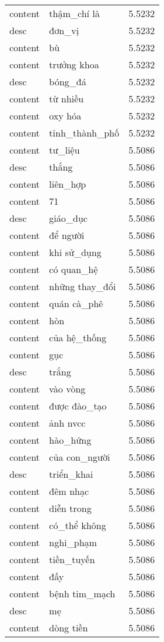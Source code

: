 \documentclass{article}
\begin{document}
\begin{tabular}{lll}
content & thậm\_chí là & 5.5232\\
desc & đơn\_vị & 5.5232\\
content & bù & 5.5232\\
content & trưởng khoa & 5.5232\\
desc & bóng\_đá & 5.5232\\
content & từ nhiều & 5.5232\\
content & oxy hóa & 5.5232\\
content & tỉnh\_thành\_phố & 5.5232\\
content & tư\_liệu & 5.5086\\
desc & thắng & 5.5086\\
content & liên\_hợp & 5.5086\\
content & 71 & 5.5086\\
desc & giáo\_dục & 5.5086\\
content & để người & 5.5086\\
content & khi sử\_dụng & 5.5086\\
content & có quan\_hệ & 5.5086\\
content & những thay\_đổi & 5.5086\\
content & quán cà\_phê & 5.5086\\
content & hòn & 5.5086\\
content & của hệ\_thống & 5.5086\\
content & gục & 5.5086\\
desc & trắng & 5.5086\\
content & vào vòng & 5.5086\\
content & được đào\_tạo & 5.5086\\
content & ảnh nvcc & 5.5086\\
content & hào\_hứng & 5.5086\\
content & của con\_người & 5.5086\\
desc & triển\_khai & 5.5086\\
content & đêm nhạc & 5.5086\\
content & diễn trong & 5.5086\\
content & có\_thể không & 5.5086\\
content & nghi\_phạm & 5.5086\\
content & tiền\_tuyến & 5.5086\\
content & đấy & 5.5086\\
content & bệnh tim\_mạch & 5.5086\\
desc & mẹ & 5.5086\\
content & dòng tiền & 5.5086\\

\end{tabular}
\end{document}
